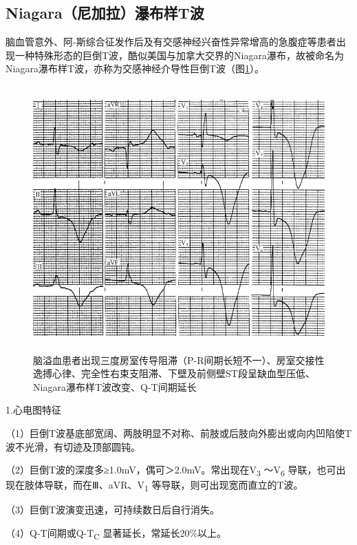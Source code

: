 \protect\hypertarget{text00012.htmlux5cux23subid89}{}{}

\subsection{Niagara（尼加拉）瀑布样T波}

脑血管意外、阿-斯综合征发作后及有交感神经兴奋性异常增高的急腹症等患者出现一种特殊形态的巨倒T波，酷似美国与加拿大交界的Niagara瀑布，故被命名为Niagara瀑布样T波，亦称为交感神经介导性巨倒T波（图\ref{fig6-2}）。

\begin{figure}[!htbp]
 \centering
 \includegraphics[width=4.95833in,height=4.01042in]{./images/Image00094.jpg}
 \captionsetup{justification=centering}
 \caption{脑溢血患者出现三度房室传导阻滞（P-R间期长短不一）、房室交接性逸搏心律、完全性右束支阻滞、下壁及前侧壁ST段呈缺血型压低、Niagara瀑布样T波改变、Q-T间期延长}
 \label{fig6-2}
  \end{figure} 

1.心电图特征

（1）巨倒T波基底部宽阔、两肢明显不对称、前肢或后肢向外膨出或向内凹陷使T波不光滑，有切迹及顶部圆钝。

（2）巨倒T波的深度多≥1.0mV，偶可＞2.0mV。常出现在V\textsubscript{3}
～V\textsubscript{6}
导联，也可出现在肢体导联，而在Ⅲ、aVR、V\textsubscript{1}
等导联，则可出现宽而直立的T波。

（3）巨倒T波演变迅速，可持续数日后自行消失。

（4）Q-T间期或Q-T\textsubscript{C} 显著延长，常延长20\%以上。

